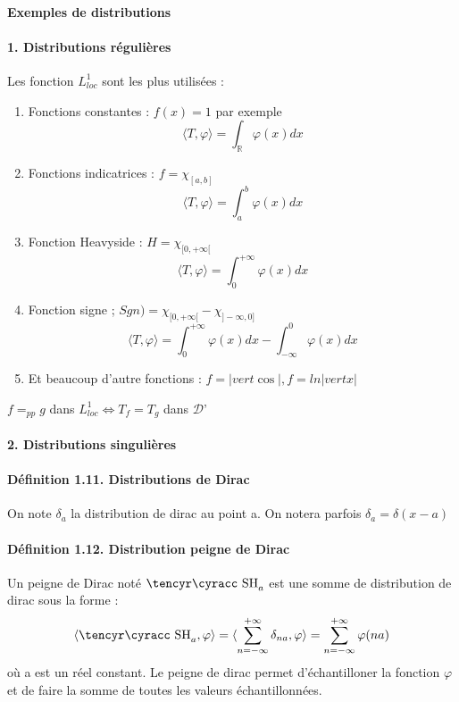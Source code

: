 \documentclass[12pt,a4paper]{report}
\newcommand{\ens}[1]{\mathbb{#1}}
\newcommand{\D}{\ensuremath{\mathcal{D}}}
\def\cyr{\tencyr\cyracc}
\def\dc{\mbox{\cyr SH}}
\begin{document}
\paragraph{Exemples de distributions}
\paragraph{1. Distributions régulières}
Les fonction \(L^1_{loc}\) sont les plus utilisées :
\begin{enumerate}
	\item Fonctions constantes : \(f(x) =1 \) par exemple
	\[
		\langle T, \varphi \rangle = \int_{\ens{R}} \varphi(x) dx
	\]
	\item Fonctions indicatrices : \(f = \chi_{[a,b]}\)
	\[
		\langle T, \varphi \rangle = \int_{a}^b \varphi(x) dx
	\]
	\item Fonction Heavyside : \(H = \chi_{[0,+\infty[}\)
	\[
		\langle T, \varphi \rangle = \int_{0}^{+\infty} \varphi(x) dx
	\]
	\item Fonction signe ; \(Sgn ) = \chi_{[0,+\infty[} - \chi_{]-\infty, 0]} \)
	\[
		\langle T, \varphi \rangle = \int_{0}^{+\infty} \varphi(x) dx - \int_{-\infty}^0 \varphi(x) dx
	\]
	\item Et beaucoup d'autre fonctions : \(f = |vert \cos \vert, f = ln |vert x \vert\)
\end{enumerate}

\(f =_{pp} g\) dans \(L^1_{loc} \Leftrightarrow T_f = T_g\) dans \D'

\paragraph{2. Distributions singulières}

\paragraph{Définition 1.11. Distributions de Dirac}
On note \(\delta_a\) la distribution de dirac au point a. On notera parfois \(\delta_a = \delta(x-a)\)

\paragraph{Définition 1.12. Distribution peigne de Dirac}
	Un peigne de Dirac noté \(\dc_a\) est une somme de distribution de dirac sous la forme :
	\[
		\langle \dc_a, \varphi \rangle = \langle \sum_{n = -\infty}^{+\infty} \delta_{na}, \varphi \rangle = \sum_{n = -\infty}^{+\infty} \varphi(na)
	\]
	où a est un réel constant. Le peigne de dirac permet d'échantilloner la fonction \(\varphi\) et de faire la somme de toutes les valeurs échantillonnées.
	
\end{document}
